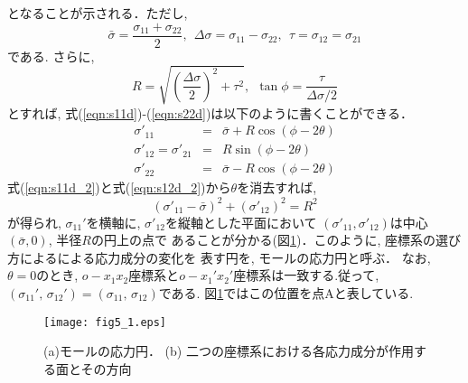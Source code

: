 \documentclass[10pt,a4j]{jarticle}
\begin{document}
となることが示される．ただし, 
\begin{equation}
	\bar \sigma = \frac{\sigma_{11}+\sigma_{22}}{2}, \ \ 
	\Delta \sigma = \sigma_{11} -\sigma_{22}, \ \ 
	\tau = \sigma_{12}=\sigma_{21}
	\label{eqn:def_sig_bar}
\end{equation}
である. さらに,
\begin{equation}
	R=\sqrt{\left(\frac{\Delta \sigma}{2}\right)^2 + \tau ^2 }, \ \ 
	\tan \phi = \frac{\tau}{\Delta\sigma /2}
	\label{eqn:def_R}
\end{equation}
とすれば, 式(\ref{eqn:s11d})-(\ref{eqn:s22d})は以下のように書くことができる．
\begin{eqnarray}
	\sigma'_{11} &=& \bar{\sigma}+R \cos \left( \phi -2\theta \right) 
		\label{eqn:s11d_2} \\
	\sigma'_{12}=\sigma'_{21} &=&  R \sin \left( \phi -2 \theta \right)
		\label{eqn:s12d_2} \\
	\sigma'_{22} &=& \bar{\sigma} - R \cos \left( \phi-2\theta \right) 
		\label{eqn:s22d_2}
\end{eqnarray}
式(\ref{eqn:s11d_2})と式(\ref{eqn:s12d_2})から$\theta$を消去すれば, 
\begin{equation}
	\left( \sigma'_{11} -\bar{\sigma}\right)^2 + \left(\sigma'_{12}\right)^2 = R^2
\end{equation}
が得られ, $\sigma_{11}'$を横軸に, $\sigma'_{12}$を縦軸とした平面において
$(\sigma'_{11}, \sigma'_{12})$は中心$(\bar{\sigma}, 0)$, 半径$R$の円上の点で
あることが分かる(図\ref{fig:fig5_1})．このように, 座標系の選び方によるによる応力成分の変化を
表す円を, モールの応力円と呼ぶ．
なお, $\theta=0$のとき, $o-x_1x_2$座標系と$o-x_1'x_2'$座標系は一致する.従って, 
$(\sigma_{11}',\,\sigma_{12}')= (\sigma_{11},\,\sigma_{12})$である.
図\ref{fig:fig5_1}ではこの位置を点Aと表している.
\begin{figure}[h]
	\begin{center}
	\texttt{[image: fig5\_1.eps]} 
	\end{center}
	\caption{
		(a)モールの応力円．
	(b) 二つの座標系における各応力成分が作用する面とその方向
	} 
	\label{fig:fig5_1}
\end{figure}
\end{document}
